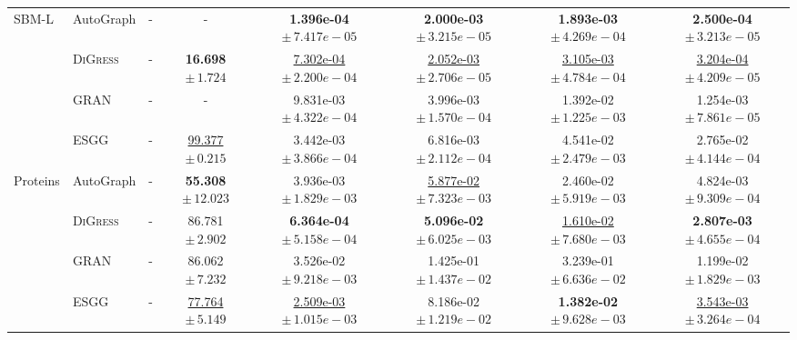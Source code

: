 {\begin{tabular}{llcccccc}
\midrule
\textsc{SBM-L} & AutoGraph & - & - & \textbf{1.396e-04 $\pm\,\scriptstyle{7.417e-05}$} & \textbf{2.000e-03 $\pm\,\scriptstyle{3.215e-05}$} & \textbf{1.893e-03 $\pm\,\scriptstyle{4.269e-04}$} & \textbf{2.500e-04 $\pm\,\scriptstyle{3.213e-05}$} \\
 & \textsc{DiGress} & - & \textbf{16.698 $\pm\,\scriptstyle{1.724}$} & \underline{7.302e-04 $\pm\,\scriptstyle{2.200e-04}$} & \underline{2.052e-03 $\pm\,\scriptstyle{2.706e-05}$} & \underline{3.105e-03 $\pm\,\scriptstyle{4.784e-04}$} & \underline{3.204e-04 $\pm\,\scriptstyle{4.209e-05}$} \\
 & GRAN & - & - & 9.831e-03 $\pm\,\scriptstyle{4.322e-04}$ & 3.996e-03 $\pm\,\scriptstyle{1.570e-04}$ & 1.392e-02 $\pm\,\scriptstyle{1.225e-03}$ & 1.254e-03 $\pm\,\scriptstyle{7.861e-05}$ \\
 & ESGG & - & \underline{99.377 $\pm\,\scriptstyle{0.215}$} & 3.442e-03 $\pm\,\scriptstyle{3.866e-04}$ & 6.816e-03 $\pm\,\scriptstyle{2.112e-04}$ & 4.541e-02 $\pm\,\scriptstyle{2.479e-03}$ & 2.765e-02 $\pm\,\scriptstyle{4.144e-04}$ \\
\midrule
Proteins & AutoGraph & - & \textbf{55.308 $\pm\,\scriptstyle{12.023}$} & 3.936e-03 $\pm\,\scriptstyle{1.829e-03}$ & \underline{5.877e-02 $\pm\,\scriptstyle{7.323e-03}$} & 2.460e-02 $\pm\,\scriptstyle{5.919e-03}$ & 4.824e-03 $\pm\,\scriptstyle{9.309e-04}$ \\
 & \textsc{DiGress} & - & 86.781 $\pm\,\scriptstyle{2.902}$ & \textbf{6.364e-04 $\pm\,\scriptstyle{5.158e-04}$} & \textbf{5.096e-02 $\pm\,\scriptstyle{6.025e-03}$} & \underline{1.610e-02 $\pm\,\scriptstyle{7.680e-03}$} & \textbf{2.807e-03 $\pm\,\scriptstyle{4.655e-04}$} \\
 & GRAN & - & 86.062 $\pm\,\scriptstyle{7.232}$ & 3.526e-02 $\pm\,\scriptstyle{9.218e-03}$ & 1.425e-01 $\pm\,\scriptstyle{1.437e-02}$ & 3.239e-01 $\pm\,\scriptstyle{6.636e-02}$ & 1.199e-02 $\pm\,\scriptstyle{1.829e-03}$ \\
 & ESGG & - & \underline{77.764 $\pm\,\scriptstyle{5.149}$} & \underline{2.509e-03 $\pm\,\scriptstyle{1.015e-03}$} & 8.186e-02 $\pm\,\scriptstyle{1.219e-02}$ & \textbf{1.382e-02 $\pm\,\scriptstyle{9.628e-03}$} & \underline{3.543e-03 $\pm\,\scriptstyle{3.264e-04}$} \\
\bottomrule
\end{tabular}}